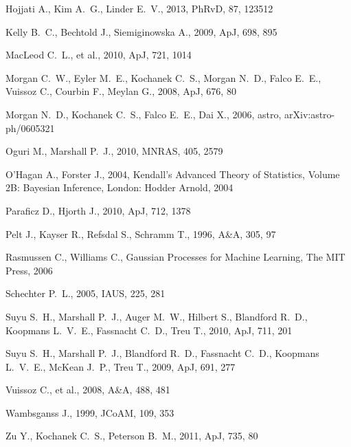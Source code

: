 \documentclass[useAMS,usenatbib, a4paper]{mn2e} \usepackage{natbib}
\begin{document}
\begin{thebibliography}{99}
 Hojjati A., Kim A.~G., Linder E.~V., 2013, PhRvD, 87, 123512 

 Kelly B.~C., Bechtold J., Siemiginowska A., 2009, ApJ, 698, 895 

 MacLeod C.~L., et al., 2010, ApJ, 721, 
1014 

Morgan C.~W., Eyler M.~E., Kochanek C.~S., Morgan N.~D., Falco E.~E., 
Vuissoz C., Courbin F., Meylan G., 2008, ApJ, 676, 80 

Morgan N.~D., Kochanek C.~S., Falco E.~E., Dai X., 2006, astro, 
arXiv:astro-ph/0605321 

 Oguri M., Marshall P.~J., 2010, MNRAS, 405, 2579 

 O'Hagan A., Forster J., 2004, Kendall's Advanced Theory of Statistics, Volume 2B: Bayesian Inference, London: Hodder Arnold, 2004

 Paraficz D., Hjorth J., 2010, ApJ, 712, 1378 

 Pelt J., Kayser R., Refsdal S., Schramm T., 1996, A\&A, 305, 97 

 Rasmussen C., Williams C., Gaussian Processes for Machine Learning, The MIT Press, 2006

Schechter P.~L., 2005, IAUS, 225, 281 

Suyu S.~H., Marshall P.~J., Auger M.~W., Hilbert S., Blandford R.~D., 
Koopmans L.~V.~E., Fassnacht C.~D., Treu T., 2010, ApJ, 711, 201 

Suyu S.~H., Marshall P.~J., Blandford R.~D., Fassnacht C.~D., Koopmans 
L.~V.~E., McKean J.~P., Treu T., 2009, ApJ, 691, 277 

 Vuissoz C., et al., 2008, A\&A, 488, 481 

Wambsganss J., 1999, JCoAM, 109, 353 

 Zu Y., Kochanek C.~S., Peterson B.~M., 2011, ApJ, 735, 80 
\end{thebibliography}
\end{document}
